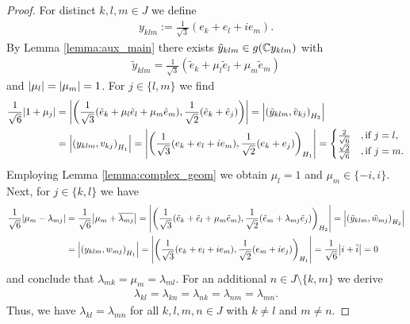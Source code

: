 \begin{proof}
	 For distinct $k,l,m \in J$ we define
	 \begin{align*}
	 	y_{klm} := \frac{1}{\sqrt{3}}(e_k + e_l + ie_m).
	 \end{align*}
	 By Lemma \ref{lemma:aux_main} there exists $\tilde{y}_{klm} \in g(\mathbb{C} y_{klm})$ with 
	 \begin{align*}
	 	\tilde{y}_{klm} = \frac{1}{\sqrt{3}}(\tilde{e}_k + \mu_l \tilde{e}_l + \mu_m \tilde{e}_m)
	 \end{align*}
	 and ${\left | \mu_l \right |} = {\left | \mu_m \right |} = 1$. For $j \in \{l,m\}$ we find
	 \begin{align*}
	 	\frac{1}{\sqrt{6}} {\left | 1 + \mu_j \right |} &= {\left | {\left ( \frac{1}{\sqrt{3}}(\tilde{e}_k + \mu_l \tilde{e}_l + \mu_m \tilde{e}_m), \frac{1}{\sqrt{2}}(\tilde{e}_k + \tilde{e}_j) \right )} \right |} = {\left | {\left ( \tilde{y}_{klm}, \tilde{v}_{kj} \right )}_{H_2} \right |} \\
	 	&= {\left | {\left ( y_{klm}, v_{kj} \right )}_{H_1} \right |} = {\left | {\left ( \frac{1}{\sqrt{3}}(e_k + e_l + ie_m), \frac{1}{\sqrt{2}}(e_k + e_j) \right )}_{H_1} \right |} = 
	 	\begin{cases}
	 		\frac{2}{\sqrt{6}} &, \text{if } j = l, \\
	 		\frac{\sqrt{2}}{\sqrt{6}} &, \text{if } j = m.
	 	\end{cases}
	\end{align*}
	Employing Lemma \ref{lemma:complex_geom} we obtain $\mu_l = 1$ and $\mu_m \in \{-i, i\}$. Next, for $j \in \{k,l\}$ we have
	\begin{align*}
		\frac{1}{\sqrt{6}} {\left | \mu_m - \lambda_{mj} \right |} &= \frac{1}{\sqrt{6}} {\left | \mu_m + \overline{\lambda_{mj}} \right |} = {\left | {\left ( \frac{1}{\sqrt{3}}(\tilde{e}_k + \tilde{e}_l + \mu_m \tilde{e}_m), \frac{1}{\sqrt{2}}(\tilde{e}_m + \lambda_{mj} \tilde{e}_j) \right )}_{H_2} \right |} = {\left | {\left ( \tilde{y}_{klm}, \tilde{w}_{mj} \right )}_{H_2} \right |} \\
		&= {\left | {\left ( y_{klm}, w_{mj} \right )}_{H_1} \right |} = {\left | {\left ( \frac{1}{\sqrt{3}}(e_k + e_l + ie_m), \frac{1}{\sqrt{2}}(e_m + ie_j) \right )}_{H_1} \right |} = \frac{1}{\sqrt{6}}{\left | i + \overline{i} \right |} = 0
	\end{align*}
	and conclude that $\lambda_{mk} = \mu_m = \lambda_{ml}$. For an additional $n \in J \setminus\{k, m\}$ we derive
	\begin{align*}
		\lambda_{kl} = \lambda_{kn} = \lambda_{nk} = \lambda_{nm} = \lambda_{mn}.
	\end{align*}
	Thus, we have $\lambda_{kl} = \lambda_{mn}$ for all $k,l,m,n \in J$ with $k \neq l$ and $m \neq n$. 
	

\end{proof}
